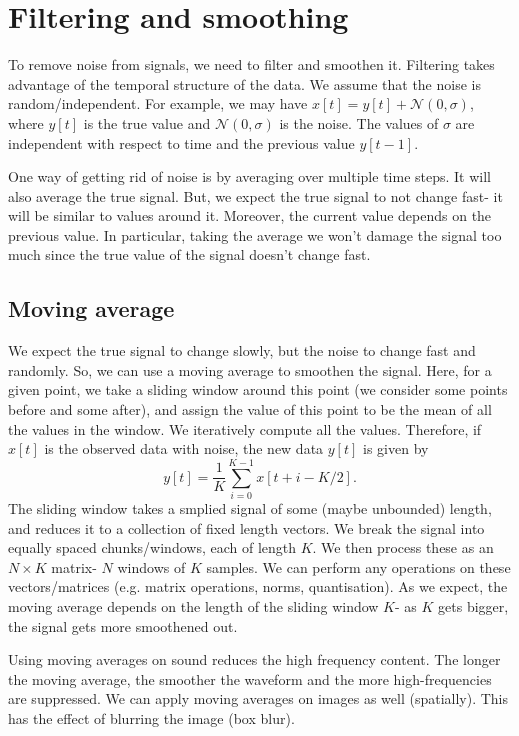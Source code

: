 \documentclass[a4paper, openany]{memoir}
\begin{document}
\section{Filtering and smoothing}
To remove noise from signals, we need to filter and smoothen it. Filtering takes advantage of the temporal structure of the data. We assume that the noise is random/independent. For example, we may have $x[t] = y[t] + \mathcal{N}(0, \sigma)$, where $y[t]$ is the true value and $\mathcal{N}(0, \sigma)$ is the noise. The values of $\sigma$ are independent with respect to time and the previous value $y[t-1]$.

One way of getting rid of noise is by averaging over multiple time steps. It will also average the true signal. But, we expect the true signal to not change fast- it will be similar to values around it. Moreover, the current value depends on the previous value. In particular, taking the average we won't damage the signal too much since the true value of the signal doesn't change fast.

\subsection{Moving average}
We expect the true signal to change slowly, but the noise to change fast and randomly. So, we can use a moving average to smoothen the signal. Here, for a given point, we take a sliding window around this point (we consider some points before and some after), and assign the value of this point to be the mean of all the values in the window. We iteratively compute all the values. Therefore, if $x[t]$ is the observed data with noise, the new data $y[t]$ is given by
\[y[t] = \frac{1}{K} \sum_{i=0}^{K-1} x[t+i-K/2].\]
The sliding window takes a smplied signal of some (maybe unbounded) length, and reduces it to a collection of fixed length vectors. We break the signal into equally spaced chunks/windows, each of length $K$. We then process these as an $N \times K$ matrix- $N$ windows of $K$ samples. We can perform any operations on these vectors/matrices (e.g. matrix operations, norms, quantisation). As we expect, the moving average depends on the length of the sliding window $K$- as $K$ gets bigger, the signal gets more smoothened out.

Using moving averages on sound reduces the high frequency content. The longer the moving average, the smoother the waveform and the more high-frequencies are suppressed. We can apply moving averages on images as well (spatially). This has the effect of blurring the image (box blur).
\newpage
\end{document}
